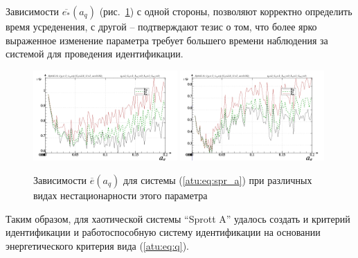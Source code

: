 Зависимости $\overline{e_*}(a_q)$ (рис.~\ref{atu:f:spr_a_e_a_q})
с одной стороны, позволяют корректно определить время усреденения,
с другой -- подтверждают тезис о том, что более ярко выраженное изменение
параметра требует большего времени наблюдения за системой
для проведения идентификации.

\begin{figure}[htb!]
\centerline{
  \includegraphics[width=0.49\textwidth]{p/cha/spr_a/sprott_a_m5p-p_a_q_e_sign.png}
  \includegraphics[width=0.49\textwidth]{p/cha/spr_a/sprott_a_m5p-p_a_q_e_sin.png}
}
  \caption{Зависимости  $\overline{e}(a_q)$ для системы (\ref{atu:eq:spr_a})
  при различных видах нестационарности этого параметра
}
\label{atu:f:spr_a_e_a_q}
\end{figure}

Таким образом, для хаотической системы ``Sprott A''
удалось создать и критерий идентификации и работоспособную систему идентификации
на основании энергетического критерия вида (\ref{atu:eq:q}).


